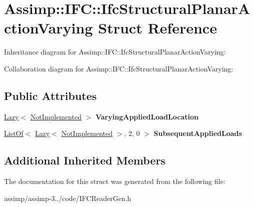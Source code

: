 \hypertarget{struct_assimp_1_1_i_f_c_1_1_ifc_structural_planar_action_varying}{\section{Assimp\+:\+:I\+F\+C\+:\+:Ifc\+Structural\+Planar\+Action\+Varying Struct Reference}
\label{struct_assimp_1_1_i_f_c_1_1_ifc_structural_planar_action_varying}
}


Inheritance diagram for Assimp\+:\+:I\+F\+C\+:\+:Ifc\+Structural\+Planar\+Action\+Varying\+:


Collaboration diagram for Assimp\+:\+:I\+F\+C\+:\+:Ifc\+Structural\+Planar\+Action\+Varying\+:
\subsection*{Public Attributes}
\begin{DoxyCompactItemize}
\item 
\hypertarget{struct_assimp_1_1_i_f_c_1_1_ifc_structural_planar_action_varying_a29351863451403bcea1f63703260f766}{\hyperlink{struct_assimp_1_1_s_t_e_p_1_1_lazy}{Lazy}$<$ \hyperlink{struct_assimp_1_1_i_f_c_1_1_not_implemented}{Not\+Implemented} $>$ {\bfseries Varying\+Applied\+Load\+Location}}\label{struct_assimp_1_1_i_f_c_1_1_ifc_structural_planar_action_varying_a29351863451403bcea1f63703260f766}

\item 
\hypertarget{struct_assimp_1_1_i_f_c_1_1_ifc_structural_planar_action_varying_adf21984981604fbfbd519290a317bca4}{\hyperlink{struct_assimp_1_1_s_t_e_p_1_1_list_of}{List\+Of}$<$ \hyperlink{struct_assimp_1_1_s_t_e_p_1_1_lazy}{Lazy}$<$ \hyperlink{struct_assimp_1_1_i_f_c_1_1_not_implemented}{Not\+Implemented} $>$, 2, 0 $>$ {\bfseries Subsequent\+Applied\+Loads}}\label{struct_assimp_1_1_i_f_c_1_1_ifc_structural_planar_action_varying_adf21984981604fbfbd519290a317bca4}

\end{DoxyCompactItemize}
\subsection*{Additional Inherited Members}


The documentation for this struct was generated from the following file\+:\begin{DoxyCompactItemize}
\item 
assimp/assimp-\/3../code/I\+F\+C\+Reader\+Gen.\+h\end{DoxyCompactItemize}
